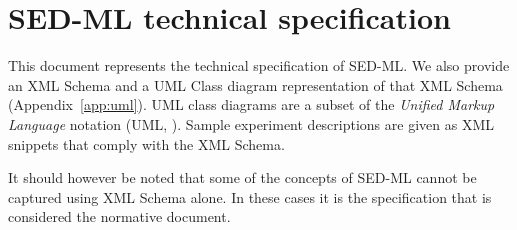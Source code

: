 \chapter{SED-ML technical specification}
\label{chp:specification}

This document represents the technical specification of SED-ML. We also provide an
XML Schema \citep{xmls} and a UML Class diagram representation of that XML Schema (Appendix~\ref{app:uml}). UML class diagrams are a subset of the \emph{Unified Markup Language} notation (UML, \citep{uml22}). Sample experiment descriptions are given as XML snippets that comply with the XML Schema.

It should however be noted that some of the concepts of SED-ML cannot be captured using XML Schema alone. In these cases it is the specification that is considered the normative document. 






  

  

